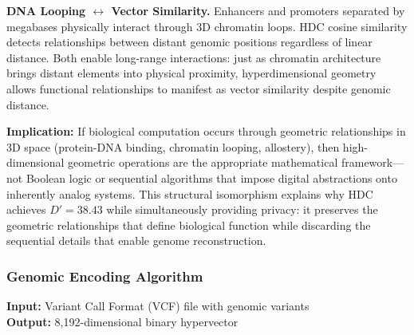 \documentclass[11pt,letterpaper]{article}
\begin{document}
\textbf{DNA Looping $\leftrightarrow$ Vector Similarity.} Enhancers and promoters separated by megabases physically interact through 3D chromatin loops. HDC cosine similarity detects relationships between distant genomic positions regardless of linear distance. Both enable long-range interactions: just as chromatin architecture brings distant elements into physical proximity, hyperdimensional geometry allows functional relationships to manifest as vector similarity despite genomic distance.

\textbf{Implication:} If biological computation occurs through geometric relationships in 3D space (protein-DNA binding, chromatin looping, allostery), then high-dimensional geometric operations are the appropriate mathematical framework---not Boolean logic or sequential algorithms that impose digital abstractions onto inherently analog systems. This structural isomorphism explains why HDC achieves $D'=38.43$ while simultaneously providing privacy: it preserves the geometric relationships that define biological function while discarding the sequential details that enable genome reconstruction.

\subsubsection{Genomic Encoding Algorithm}

\textbf{Input:} Variant Call Format (VCF) file with genomic variants\\
\textbf{Output:} 8,192-dimensional binary hypervector
\end{document}
